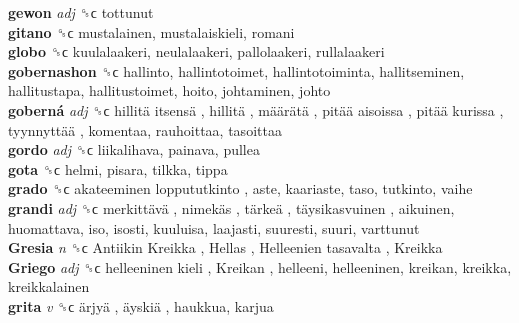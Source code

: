 \textbf{gewon} \emph{adj}  ␝ϲ  tottunut  \\
\textbf{gitano} ␝ϲ  mustalainen, mustalaiskieli, romani  \\
\textbf{globo} ␝ϲ  kuulalaakeri, neulalaakeri, pallolaakeri, rullalaakeri  \\
\textbf{gobernashon} ␝ϲ  hallinto, hallintotoimet, hallintotoiminta, hallitseminen, hallitustapa, hallitustoimet, hoito, johtaminen, johto  \\
\textbf{goberná} \emph{adj}  ␝ϲ   hillitä itsensä ,  hillitä ,  määrätä ,  pitää aisoissa ,  pitää kurissa ,  tyynnyttää , komentaa, rauhoittaa, tasoittaa  \\
\textbf{gordo} \emph{adj}  ␝ϲ  liikalihava, painava, pullea  \\
\textbf{gota} ␝ϲ  helmi, pisara, tilkka, tippa  \\
\textbf{grado} ␝ϲ   akateeminen loppututkinto , aste, kaariaste, taso, tutkinto, vaihe  \\
\textbf{grandi} \emph{adj}  ␝ϲ   merkittävä ,  nimekäs ,  tärkeä ,  täysikasvuinen , aikuinen, huomattava, iso, isosti, kuuluisa, laajasti, suuresti, suuri, varttunut  \\
\textbf{Gresia} \emph{n}  ␝ϲ   Antiikin Kreikka ,  Hellas ,  Helleenien tasavalta ,  Kreikka   \\
\textbf{Griego} \emph{adj}  ␝ϲ   helleeninen kieli ,  Kreikan , helleeni, helleeninen, kreikan, kreikka, kreikkalainen  \\
\textbf{grita} \emph{v}  ␝ϲ   ärjyä ,  äyskiä , haukkua, karjua  \\
